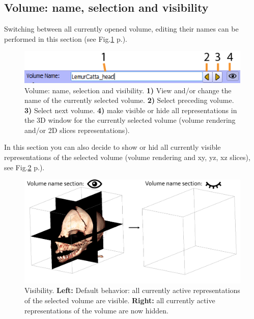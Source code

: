 \subsection{Volume: name, selection and visibility}
Switching between all currently opened volume, editing their names can be performed in this section (see Fig.\ref{volume_name} p.\pageref{volume_name}).
\begin{figure}
  \centering
  \includegraphics[scale=1]{images/14/volume_name2.png}
\caption{Volume: name, selection and visibility. \textbf{1)} View and/or change the name of the currently selected volume.  \textbf{2)} Select preceding volume.  \textbf{3)} Select next volume. \textbf{4)} make visible or hide all representations in the 3D window for the currently selected volume (volume rendering and/or 2D slices representations). }	
\label{volume_name}
 \end{figure}

In this section you can also decide to show or hid all currently visible representations of the selected volume (volume rendering and xy, yz, xz slices), see Fig.\ref{volume_name_visibility} p.\pageref{volume_name_visibility}).
\begin{figure}
  \centering
  \includegraphics[scale=0.3]{images/14/volume_name/volume_name_visibility.png}
\caption{Visibility. \textbf{Left:} Default behavior: all currently active representations of the selected volume are visible.   \textbf{Right:} all currently active representations of the volume are now hidden.}	
\label{volume_name_visibility}
 \end{figure}


